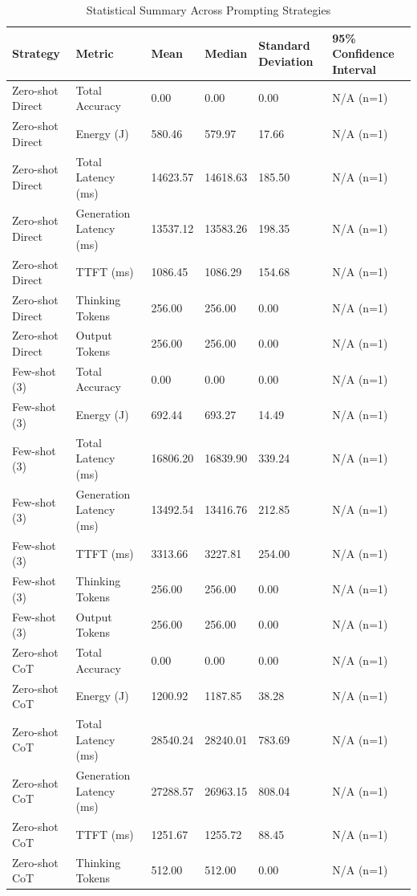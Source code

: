 \begin{table}
\caption{Statistical Summary Across Prompting Strategies}
\label{tab:statistical_summary}
\begin{tabular}{llllll}
\toprule
Strategy & Metric & Mean & Median & Standard Deviation & 95\% Confidence Interval \\
\midrule
Zero-shot Direct & Total Accuracy & 0.00 & 0.00 & 0.00 & N/A (n=1) \\
Zero-shot Direct & Energy (J) & 580.46 & 579.97 & 17.66 & N/A (n=1) \\
Zero-shot Direct & Total Latency (ms) & 14623.57 & 14618.63 & 185.50 & N/A (n=1) \\
Zero-shot Direct & Generation Latency (ms) & 13537.12 & 13583.26 & 198.35 & N/A (n=1) \\
Zero-shot Direct & TTFT (ms) & 1086.45 & 1086.29 & 154.68 & N/A (n=1) \\
Zero-shot Direct & Thinking Tokens & 256.00 & 256.00 & 0.00 & N/A (n=1) \\
Zero-shot Direct & Output Tokens & 256.00 & 256.00 & 0.00 & N/A (n=1) \\
Few-shot (3) & Total Accuracy & 0.00 & 0.00 & 0.00 & N/A (n=1) \\
Few-shot (3) & Energy (J) & 692.44 & 693.27 & 14.49 & N/A (n=1) \\
Few-shot (3) & Total Latency (ms) & 16806.20 & 16839.90 & 339.24 & N/A (n=1) \\
Few-shot (3) & Generation Latency (ms) & 13492.54 & 13416.76 & 212.85 & N/A (n=1) \\
Few-shot (3) & TTFT (ms) & 3313.66 & 3227.81 & 254.00 & N/A (n=1) \\
Few-shot (3) & Thinking Tokens & 256.00 & 256.00 & 0.00 & N/A (n=1) \\
Few-shot (3) & Output Tokens & 256.00 & 256.00 & 0.00 & N/A (n=1) \\
Zero-shot CoT & Total Accuracy & 0.00 & 0.00 & 0.00 & N/A (n=1) \\
Zero-shot CoT & Energy (J) & 1200.92 & 1187.85 & 38.28 & N/A (n=1) \\
Zero-shot CoT & Total Latency (ms) & 28540.24 & 28240.01 & 783.69 & N/A (n=1) \\
Zero-shot CoT & Generation Latency (ms) & 27288.57 & 26963.15 & 808.04 & N/A (n=1) \\
Zero-shot CoT & TTFT (ms) & 1251.67 & 1255.72 & 88.45 & N/A (n=1) \\
Zero-shot CoT & Thinking Tokens & 512.00 & 512.00 & 0.00 & N/A (n=1) \\

\end{tabular}
\end{table}
